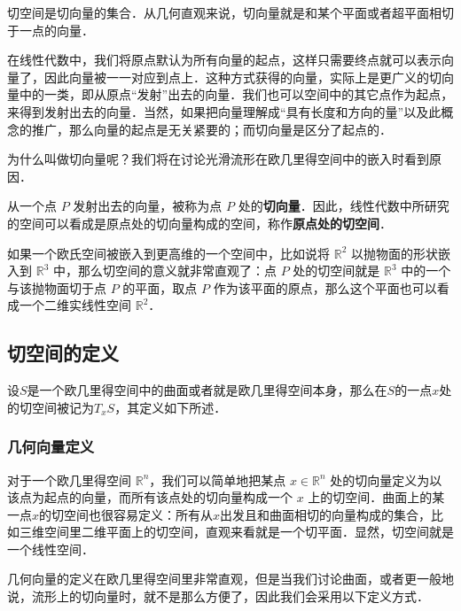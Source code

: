 

切空间是切向量的集合．从几何直观来说，切向量就是和某个平面或者超平面相切于一点的向量．

在线性代数中，我们将原点默认为所有向量的起点，这样只需要终点就可以表示向量了，因此向量被一一对应到点上．这种方式获得的向量，实际上是更广义的切向量中的一类，即从原点“发射”出去的向量．我们也可以空间中的其它点作为起点，来得到发射出去的向量．当然，如果把向量理解成“具有长度和方向的量”以及此概念的推广，那么向量的起点是无关紧要的；而切向量是区分了起点的．

为什么叫做切向量呢？我们将在讨论光滑流形在欧几里得空间中的嵌入时看到原因．%

从一个点 $P$ 发射出去的向量，被称为点 $P$ 处的\textbf{切向量}．因此，线性代数中所研究的空间可以看成是原点处的切向量构成的空间，称作\textbf{原点处的切空间}．

如果一个欧氏空间被嵌入到更高维的一个空间中，比如说将 $\mathbb{R}^2$ 以抛物面的形状嵌入到 $\mathbb{R}^3$ 中，那么切空间的意义就非常直观了：点 $P$ 处的切空间就是 $\mathbb{R}^3$ 中的一个与该抛物面切于点 $P$ 的平面，取点 $P$ 作为该平面的原点，那么这个平面也可以看成一个二维实线性空间 $\mathbb{R}^2$．

\subsection{切空间的定义}

设$S$是一个欧几里得空间中的曲面或者就是欧几里得空间本身，那么在$S$的一点$x$处的切空间被记为$T_xS$，其定义如下所述．

\subsubsection{几何向量定义}

对于一个欧几里得空间 $\mathbb{R}^n$，我们可以简单地把某点 $x\in\mathbb{R}^n$ 处的切向量定义为以该点为起点的向量，而所有该点处的切向量构成一个 $x$ 上的切空间．曲面上的某一点$x$的切空间也很容易定义：所有从$x$出发且和曲面相切的向量构成的集合，比如三维空间里二维平面上的切空间，直观来看就是一个切平面．显然，切空间就是一个线性空间．

几何向量的定义在欧几里得空间里非常直观，但是当我们讨论曲面，或者更一般地说，流形上的切向量时，就不是那么方便了，因此我们会采用以下定义方式．

